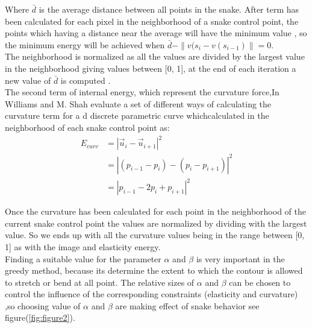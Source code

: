 \hspace{-0.6cm}Where $\bar{d}$ is the average distance between all points in the snake. After term has
been calculated for each pixel in the neighborhood of a snake control point, the
points which having a distance near the average will have the minimum
value \cite{2.7}, so the minimum energy will be achieved when $\bar{d} - \| v(s_{i} - v(s_{i-1}) \| = 0$.\\
The neighborhood is normalized as all the values are divided by the largest
value in the neighborhood giving values between [0, 1], at the end of each
iteration a new value of $\bar{d}$ is computed \cite{2.7}. \\
The second term of internal energy, which represent the curvature force,In
Williams and M. Shah \cite{2.7} evaluate a set of different ways of calculating the
curvature term for a d discrete parametric curve whichcalculated in the
neighborhood of each snake control point as:
\begin{equation}
        \begin{aligned}
                E_{curv} & = | \vec{u}_i - \vec{u}_{i+1} |^2 \\
                & = | (p_{i-1} - p_i) - (p_i - p_{i+1}) | ^2 \\
                & = | p_{i-1} - 2p_i + p_{i+1} | ^ 2
        \end{aligned}
        \label{eq:eq19}
\end{equation}

\hspace{-0.6cm}Once the curvature has been calculated for each point in the neighborhood of
the current snake control point the values are normalized by dividing
with the largest value. So we ends up with all the curvature values being in
the range between [0, 1] as with the image and elasticity energy.\\
Finding a suitable value for the parameter $\alpha$ and $\beta$ is very important in the
greedy method, because its determine the extent to which the contour is
allowed to stretch or bend at all point. The relative sizes of $\alpha$ and $\beta$ can be
chosen to control the influence of the corresponding constraints (elasticity and
curvature)\cite{2.7} ,so choosing value of $\alpha$ and $\beta$ are making effect of snake
behavior see figure(\ref{fig:figure2}).

